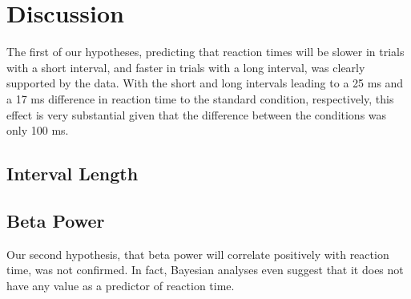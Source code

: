 \documentclass[man,floatsintext]{apa6} %
\begin{document}
\section{Discussion}

%

%





The first of our hypotheses, predicting that reaction times will be
slower in trials with a short interval, and faster in trials with a
long interval, was clearly supported by the data.  With the short and
long intervals leading to a 25 ms and a 17 ms difference in reaction
time to the standard condition, respectively, this effect is very
substantial given that the difference between the conditions was only
100 ms.

\subsection{Interval Length}

\subsection{Beta Power}
Our second hypothesis, that beta power will correlate positively with
reaction time, was not confirmed.  In fact, Bayesian analyses even
suggest that it does not have any value as a predictor of reaction
time.
\end{document}
